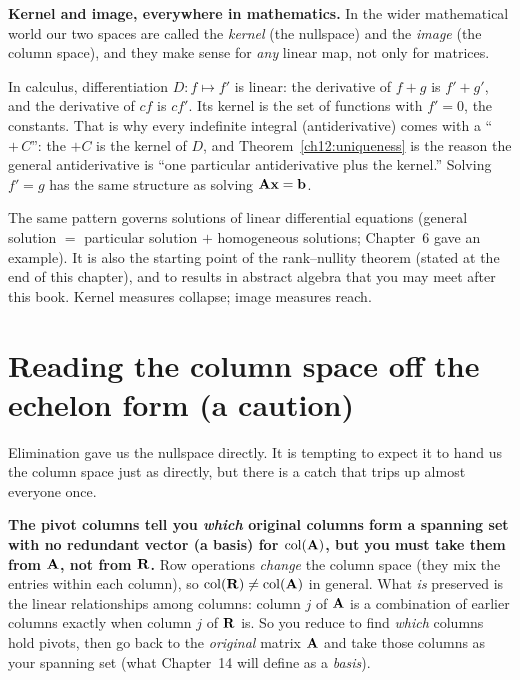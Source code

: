 \begin{connectionbox}
\textbf{Kernel and image, everywhere in mathematics.} In the wider mathematical
world our two spaces are called the \emph{kernel} (the nullspace) and the
\emph{image} (the column space), and they make sense for \emph{any} linear map, not
only for matrices.

In calculus, differentiation $D: f \mapsto f'$ is linear: the derivative of
$f+g$ is $f'+g'$, and the derivative of $cf$ is $cf'$. Its kernel is the set
of functions with $f' = 0$, the constants. That is why every indefinite
integral (antiderivative) comes with a ``$+\,C$'': the $+C$ is the kernel of $D$, and
Theorem~\ref{ch12:uniqueness} is the reason the general antiderivative is ``one
particular antiderivative plus the kernel.'' Solving $f' = g$ has the same
structure as solving $\mathbf{A}\mathbf{x}=\mathbf{b}$.

The same pattern governs solutions of linear differential equations (general
solution $=$ particular solution $+$ homogeneous solutions; Chapter~6 gave an
example). It is also the starting point of the rank--nullity theorem (stated at the end of this chapter), and
to results in abstract algebra that you may meet after this book.
Kernel measures collapse; image measures reach.
\end{connectionbox}

\section{Reading the column space off the echelon form (a caution)}

Elimination gave us the nullspace directly. It is tempting to expect it to hand us
the column space just as directly, but there is a catch that
trips up almost everyone once.

\begin{trapbox}
\textbf{The pivot columns tell you \emph{which} original columns form a spanning set with no redundant vector (a basis) for $\operatorname{col}(\mathbf{A})$, but you must take them from $\mathbf{A}$, not from $\mathbf{R}$.}
Row operations \emph{change} the column space (they mix the entries within each
column), so $\operatorname{col}(\mathbf{R})\neq\operatorname{col}(\mathbf{A})$ in general. What \emph{is} preserved
is the linear relationships among columns: column $j$ of $\mathbf{A}$ is a
combination of earlier columns exactly when column $j$ of $\mathbf{R}$ is. So you
reduce to find \emph{which} columns hold pivots, then go back to the
\emph{original} matrix $\mathbf{A}$ and take those columns as your spanning set
(what Chapter~14 will define as a \emph{basis}).
\end{trapbox}

